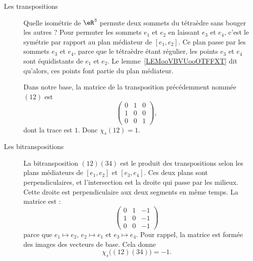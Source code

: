 \begin{description}
	\item[Les transpositions]

	      Quelle isométrie de \( \eR^3\) permute deux sommets du tétraèdre sans bouger les autres ? Pour permuter les sommets \( e_1\) et \( e_2\) en laissant \( e_3\) et \( e_4\), c'est le symétrie par rapport au plan médiateur de \( [e_1,e_2]\). Ce plan passe par les sommets \( e_3\) et \( e_4\), parce que le tétraèdre étant régulier, les points \( e_3\) et \( e_4\) sont équidistants de \( e_1\) et \( e_2\). Le lemme~\ref{LEMooVBVUooOTFFXT} dit qu'alors, ces points font partie du plan médiateur.

	      Dans notre base, la matrice de la transposition précédemment nommée \( (12)\) est
	      \begin{equation}
		      \begin{pmatrix}
			      0 & 1 & 0 \\
			      1 & 0 & 0 \\
			      0 & 0 & 1
		      \end{pmatrix},
	      \end{equation}
	      dont la trace est \( 1\). Donc \( \chi_s(12)=1\).

	\item[Les bitranspositions]

	      La bitransposition \( (12)(34)\) est le produit des transpositions selon les plans médiateurs de \( [e_1,e_2]\) et \( [e_3,e_4]\). Ces deux plans sont perpendiculaires, et l'intersection est la droite qui passe par les milieux. Cette droite est perpendiculaire aux deux segments en même temps. La matrice est :
	      \begin{equation}
		      \begin{pmatrix}
			      0 & 1 & -1 \\
			      1 & 0 & -1 \\
			      0 & 0 & -1
		      \end{pmatrix}
	      \end{equation}
	      parce que \( e_1\mapsto e_2\), \( e_2\mapsto e_1\) et \( e_3\mapsto e_4\). Pour rappel, la matrice est formée des images des vecteurs de base. Cela donne
	      \begin{equation}
		      \chi_s\big( (12)(34) \big)=-1.
	      \end{equation}


\end{description}

